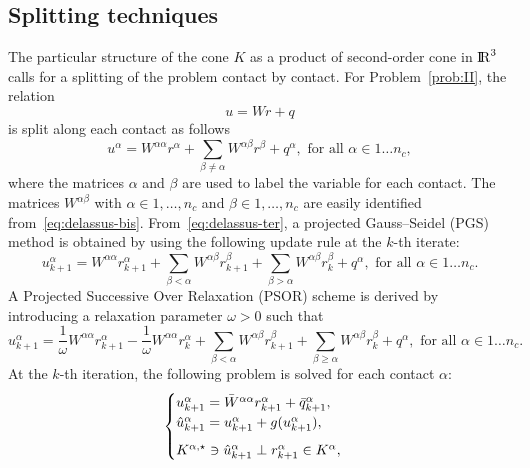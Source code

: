 \subsection{Splitting techniques}
\label{Sec:SplittingTechniques}
 The particular structure of the cone $K$ as a product of second-order cone in $\mathrm{I\!R}^3$
 calls for a splitting of the problem contact by contact.
For Problem~\ref{prob:II}, the relation
\begin{equation}
  \label{eq:delassus-bis}
  u = W r+q
\end{equation}
is split along each contact as follows
\begin{equation}
  \label{eq:delassus-ter}
  u^\alpha = W^{\alpha\alpha} r^\alpha + \sum_{\beta\neq \alpha}W^{\alpha\beta} r^\beta +  q^\alpha, \text{ for all } \alpha \in 1\ldots n_c,
\end{equation}
where the matrices $\alpha$ and $\beta$ are used to label the variable for each contact.
 The matrices $W^{\alpha\beta}$ with $\alpha \in 1,\ldots, n_c$ and $\beta \in 1,\ldots, n_c $ are easily identified from~\eqref{eq:delassus-bis}.
 From~\eqref{eq:delassus-ter}, a projected Gauss--Seidel (PGS) method is obtained by using the following update rule at the $k$-th iterate:
\begin{equation}
  \label{eq:pgs-1}
  u^{\alpha}_{k+1} = W^{\alpha\alpha} r^{\alpha}_{k+1} + \sum_{\beta < \alpha}W^{\alpha\beta} r^{\beta}_{k+1} + \sum_{\beta > \alpha}W^{\alpha\beta} r^{\beta}_{k} +  q^\alpha, \text{ for all } \alpha \in 1\ldots n_c.
\end{equation}
A Projected Successive Over Relaxation (PSOR) scheme is derived by introducing a relaxation parameter $\omega>0$ such that
\begin{equation}
  \label{eq:psor-1}
  u^{\alpha}_{k+1} = \frac 1 \omega W^{\alpha\alpha} r^{\alpha}_{k+1} 
  - \frac 1 \omega W^{\alpha\alpha} r^{\alpha}_{k} +
  \sum_{\beta < \alpha}W^{\alpha\beta} r^{\beta}_{k+1} + \sum_{\beta \geq \alpha}W^{\alpha\beta} r^{\beta}_{k} +  q^\alpha, \text{ for all } \alpha \in 1\ldots n_c.
\end{equation}
At the $k$-th iteration, the following problem is solved for each contact $\alpha$:
\begin{equation}\label{eq:psor-3}
  \begin{cases}
    u^{\alpha}_{k+1} =  \Bar W^{\alpha\alpha}  r^{\alpha}_{k+1} + \bar q^{\alpha}_{k+1}, \\
    \hat u^{\alpha}_{k+1} =u^{\alpha}_{k+1} + g(u^{\alpha}_{k+1}), \\[2mm]
    K^{\alpha,\star} \ni {\hat u^{\alpha}_{k+1}} \perp r^{\alpha}_{k+1} \in K^\alpha,
  \end{cases}
\end{equation}
